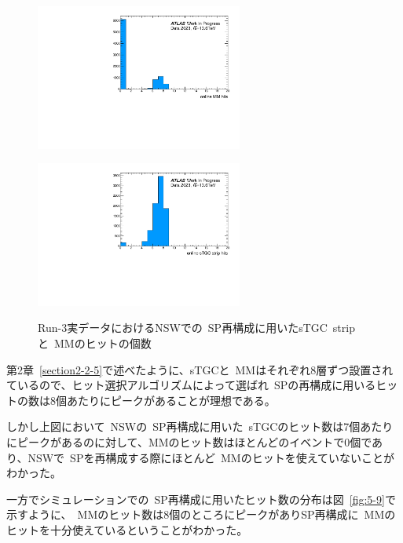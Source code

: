 \begin{figure}[H]
  \begin{minipage}[b]{0.48\linewidth}
      \centering
      \includegraphics[clip, width=6.8cm]{fig/5/data_onlinemm.pdf}
      \label{fig:5-8-1}
  \end{minipage}
    \begin{minipage}[b]{0.48\linewidth}
      \centering
      \includegraphics[clip, width=6.8cm]{fig/5/data_onlinestgceta.pdf}
      \label{fig:5-8-2}
  \end{minipage}
  \caption{Run-3実データにおけるNSWでの~SP再構成に用いたsTGC~stripと~MMのヒットの個数}
\end{figure}

第2章~\ref{section2-2-5}で述べたように、sTGCと~MMはそれぞれ8層ずつ設置されているので、ヒット選択アルゴリズムによって選ばれ~SPの再構成に用いるヒットの数は8個あたりにピークがあることが理想である。

しかし上図において~NSWの~SP再構成に用いた~sTGCのヒット数は7個あたりにピークがあるのに対して、MMのヒット数はほとんどのイベントで0個であり、NSWで~SPを再構成する際にほとんど~MMのヒットを使えていないことがわかった。

一方でシミュレーションでの~SP再構成に用いたヒット数の分布は図~\ref{fig:5-9}で示すように、~MMのヒット数は8個のところにピークがありSP再構成に~MMのヒットを十分使えているということがわかった。

